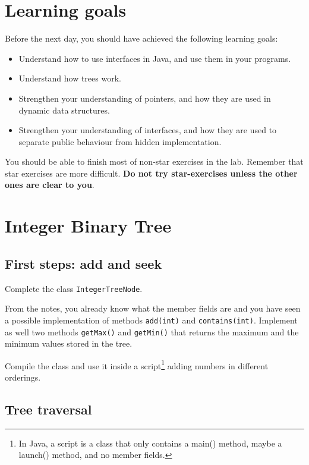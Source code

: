 \documentclass{article}
\begin{document}
\section*{Learning goals}
\label{sec:learning-goals}

Before the next day, you should have achieved the following learning
goals: 

\begin{itemize}
\item Understand how to use interfaces in Java, and use them in your
  programs. 
\item Understand how trees work.
\item Strengthen your understanding of pointers, and how they are used
  in dynamic data structures. 
\item Strengthen your understanding of interfaces, and how they are used
  to separate public behaviour from hidden implementation. 
\end{itemize}

You should be able to finish most of non-star exercises in the lab. 
Remember that star exercises are more difficult. 
\textbf{Do not try star-exercises unless the other ones are clear to
  you}.  

\section{Integer Binary Tree}
\label{sec:queues}

\subsection{First steps: add and seek}
\label{sec:first-steps:-add}

Complete the class \verb+IntegerTreeNode+. 

From the notes, you already know what the member fields are and you
have seen a possible implementation of methods \verb+add(int)+ and
\verb+contains(int)+. Implement as well two methods \verb+getMax()+
and \verb+getMin()+ that returns the maximum and the minimum values
stored in the tree. 

Compile the class and use it inside a script\footnote{In Java, a script
  is a class that only contains a main() method, maybe a launch()
  method, and no member fields.} adding numbers in different
orderings. 

\subsection{Tree traversal}
\label{sec:tree-traversal}
\end{document}
